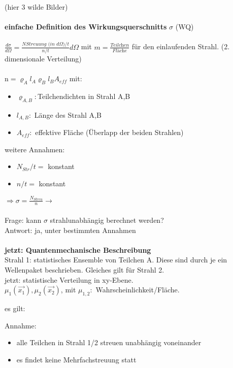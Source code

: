 (hier 3 wilde Bilder) \\ \\
\textbf{einfache Definition des Wirkungsquerschnitts} $\sigma$ (WQ) \\
\\
$\frac{d \sigma}{d \Omega} = \frac{N \textit{Streuung (in } d\Omega 
\textit{)}/t}{n/t} d \Omega$ mit $m= \frac{\textit{Teilchen}}{\textit{Fläche}}$ 
für den einlaufenden Strahl. (2. dimensionale Verteilung) \\
\\
n$= \varrho_A l_A \varrho_B l_B A_{eff}$ mit: \begin{itemize}
\item $\varrho_{A,B}: $Teilchendichten in Strahl A,B
\item $l_{A,B}: $ Länge des Strahl A,B
\item $A_{eff}: $ effektive Fläche (Überlapp der beiden Strahlen)
\end{itemize}
weitere Annahmen: \begin{itemize}
\item $N_{Str}/t =$ konstant
\item $n/t =$ konstant
\end{itemize}
$\Rightarrow \sigma = \frac{N_{Streu}}{n} \to$  \\
\\
Frage: kann $\sigma$ strahlunabhängig berechnet werden?\\
Antwort: ja, unter bestimmten Annahmen \\
\\
\textbf{jetzt: Quantenmechanische Beschreibung}\\
Strahl 1: statistisches Ensemble von Teilchen A. Diese sind durch je ein 
Wellenpaket beschrieben. Gleiches gilt für Strahl 2. \\
jetzt: statistische Verteilung in xy-Ebene. \\
$\mu_1(\vec{x_1}), \mu_2(\vec{x_2})$, mit $\mu_{1,2}: $ 
Wahrscheinlichkeit/Fläche. \\
\begin{center}
es gilt:  \\
\end{center}
Annahme: \begin{itemize}
\item alle Teilchen in Strahl 1/2 streuen unabhängig voneinander
\item es findet keine Mehrfachstreuung statt
\end{itemize}
